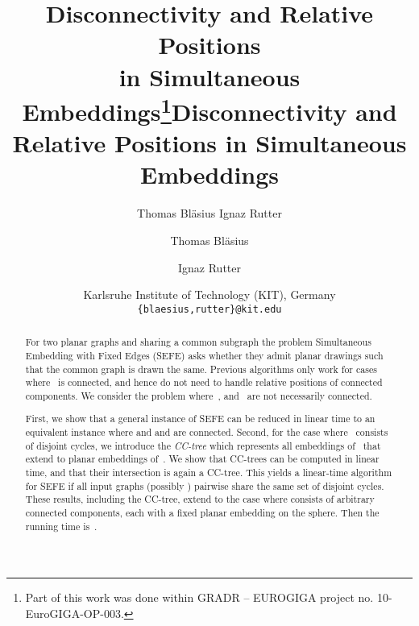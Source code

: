 \documentclass{scrartcl}
\title{\Large Disconnectivity and Relative Positions\\in Simultaneous
  Embeddings\thanks{Part of this work was done within GRADR --
    EUROGIGA project no. 10-EuroGIGA-OP-003.}}
\author{Thomas Bläsius \myand Ignaz Rutter}
\date{Karlsruhe Institute of Technology (KIT), Germany\\\medskip \texttt{\{blaesius,rutter\}@kit.edu}}
\def\arXiv{}
\newcommand{\1}[1]{{\normalfont \ensuremath{#1^{\tiny\circled{1}}}}} \newcommand{\2}[1]{{\normalfont \ensuremath{#1^{\tiny\circled{2}}}}} \renewcommand{\k}[1]{{\normalfont \ensuremath{#1^{\tiny\circled{k}}}}} \newcommand{\proj}[2]{\ensuremath{\left.#1\right|_{#2}}} \newcommand{\eps}{\varepsilon}
\theoremstyle{plain} \newtheorem{theorem}{Theorem} \newcounter{lemmacounter} \setcounter{lemmacounter}{0} \newtheorem{lemma}[lemmacounter]{Lemma} \newtheorem{fact}{Fact}  \newtheorem{corollary}{Corollary} \theoremstyle{definition} \newtheorem{definition}{Definition}
\begin{document}
\ifdefined\elsevier

\begin{frontmatter}
  
  \title{Disconnectivity and Relative Positions in Simultaneous
    Embeddings}




  \author{Thomas Bläsius} 
  \author{Ignaz Rutter}
  \address{Karlsruhe Institute of Technology (KIT), Germany}
\fi

\ifdefined\arXiv
\maketitle
\fi

  \begin{abstract}
    For two planar graphs  and 
    sharing a common subgraph  the problem {\sc
      Simultaneous Embedding with Fixed Edges (SEFE)} asks whether
    they admit planar drawings such that the common graph is drawn the
    same.  Previous algorithms only work for cases where~ is
    connected, and hence do not need to handle relative positions of
    connected components.  We consider the problem where~, 
    and~ are not necessarily connected.



    First, we show that a general instance of {\sc SEFE} can be
    reduced in linear time to an equivalent instance where 
    and  and  are connected.  Second, for the case where~
    consists of disjoint cycles, we introduce the \emph{CC-tree} which
    represents all embeddings of~ that extend to planar embeddings
    of~.  We show that CC-trees can be computed in linear time,
    and that their intersection is again a CC-tree.  This yields a
    linear-time algorithm for {\sc SEFE} if all  input graphs
    (possibly ) pairwise share the same set of disjoint cycles.
    These results, including the CC-tree, extend to the case where 
    consists of arbitrary connected components, each with a fixed
    planar embedding on the sphere.  Then the running time
    is~.
  \end{abstract}

\ifdefined\elsevier
\end{frontmatter}
\fi
\end{document}
